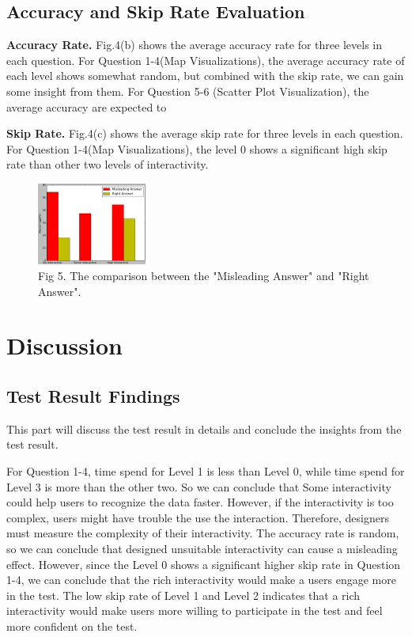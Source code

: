 \documentclass[9pt,journal,compsoc]{IEEEtran}
\begin{document}
\subsection{Accuracy and Skip Rate Evaluation}
\textbf{Accuracy Rate.} Fig.4(b) shows the average accuracy rate for three levels in each question. For Question 1-4(Map Visualizations), the average accuracy rate of each level shows somewhat random, but combined with the skip rate, we can gain some insight from them. For Question 5-6 (Scatter Plot Visualization), the average accuracy are expected to 

\textbf{Skip Rate.} Fig.4(c) shows the average skip rate for three levels in each question. For Question 1-4(Map Visualizations), the level 0 shows a significant high skip rate than other two levels of interactivity. \\

\begin{figure} [H]
  \centering
  \includegraphics[width=0.32\textwidth]{MisleadingQ6.png}
  \caption{Fig 5. The comparison between the "Misleading Answer" and "Right Answer".}
  \label{fig:6}
\end{figure}

\section{Discussion}
\large
\subsection{Test Result Findings}
This part will discuss the test result in details and conclude the insights from the test result.

For Question 1-4, time spend for Level 1 is less than Level 0, while time spend for Level 3 is more than the other two. So we can conclude that Some interactivity could help users to recognize the data faster. However, if the interactivity is too complex, users might have trouble the use the interaction. Therefore, designers must measure the complexity of their interactivity. The accuracy rate is random, so we can conclude that designed unsuitable interactivity can cause a misleading effect. However, since the Level 0 shows a significant higher skip rate in Question 1-4, we can conclude that the rich interactivity would make a users engage more in the test. The low skip rate of Level 1 and Level 2 indicates that a rich interactivity would make users more willing to participate in the test and feel more confident on the test.
\end{document}

